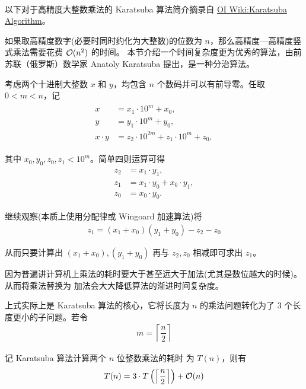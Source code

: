 \paragraph{}
以下对于高精度大整数乘法的 Karatsuba 算法简介摘录自 \href{https://oi-wiki.org/math/bignum/#karatsuba-%E4%B9%98%E6%B3%95}{OI Wiki:Karatsuba Algorithm}。

如果取高精度数字(必要时同时约化为大整数)的位数为 $n$，那么高精度—高精度竖式乘法需要花费 $\mathcal{O}(n^2)$ 的时间。
本节介绍一个时间复杂度更为优秀的算法，由前苏联（俄罗斯）数学家 Anatoly Karatsuba 提出，是一种分治算法。

考虑两个十进制大整数 $x$ 和 $y$，均包含 $n$ 个数码并可以有前导零。任取 $0 < m < n$，记
\begin{eqnarray*}
    \begin{aligned}
        x &= x_1 \cdot 10^m + x_0, \\
        y &= y_1 \cdot 10^m + y_0, \\
        x \cdot y &= z_2 \cdot 10^{2m} + z_1 \cdot 10^m + z_0,
    \end{aligned}
\end{eqnarray*}

其中 $x_0,y_0,z_0,z_1 < 10^m$。简单四则运算可得
\begin{eqnarray*}
    \begin{aligned}
        z_2 &= x_1 \cdot y_1, \\
        z_1 &= x_1 \cdot y_0 + x_0 \cdot y_1, \\
        z_0 &= x_0 \cdot y_0.
    \end{aligned}    
\end{eqnarray*}

继续观察(本质上使用分配律或 Wingoard 加速算法)将
\begin{eqnarray*}
    z_1 = (x_1 + x_0)(y_1 + y_0) - z_2 - z_0
\end{eqnarray*}

从而只要计算出 $(x_1+x_0), (y_1 + y_0)$ 再与 $z_2,z_0$ 相减即可求出 $z_1$。

因为普遍讲计算机上乘法的耗时要大于甚至远大于加法(尤其是数位越大的时候)。从而将乘法替换为
加法会大大降低算法的渐进时间复杂度。

上式实际上是 Karatsuba 算法的核心，它将长度为 $n$ 
的乘法问题转化为了 3 个长度更小的子问题。若令 
\begin{eqnarray*}
    m = \left\lceil \dfrac n 2 \right\rceil
\end{eqnarray*} 

记 Karatsuba 算法计算两个 $n$ 位整数乘法的耗时
为 $T(n)$，则有 
\begin{eqnarray*}
    T(n) = 3 \cdot T \left(\left\lceil \dfrac n 2 \right\rceil\right) + \mathcal{O}(n)
\end{eqnarray*}

